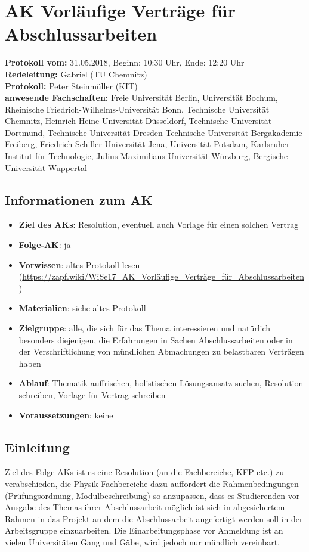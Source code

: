 
\section{AK Vorläufige Verträge für Abschlussarbeiten}

	\textbf{Protokoll vom:} 31.05.2018,
	Beginn: 10:30 Uhr,
	Ende: 12:20 Uhr \\
	\textbf{Redeleitung:} Gabriel (TU Chemnitz) \\
	\textbf{Protokoll:} Peter Steinmüller (KIT) \\
	\textbf{anwesende Fachschaften:} Freie Universität Berlin, Universität Bochum, Rheinische Friedrich-Wilhelms-Universität Bonn, Technische Universität Chemnitz, Heinrich Heine Universität Düsseldorf, Technische Universität Dortmund, Technische Universität Dresden Technische Universität Bergakademie Freiberg, Friedrich-Schiller-Universität Jena, Universität Potsdam, Karlsruher Institut für Technologie, Julius-Maximilians-Universität Würzburg, Bergische Universität Wuppertal

	\subsection*{Informationen zum AK}
		\begin{itemize}
			\item \textbf{Ziel des AKs}: Resolution, eventuell auch Vorlage für einen solchen Vertrag
			\item \textbf{Folge-AK}: ja
			\item \textbf{Vorwissen}: altes Protokoll lesen (\url{https://zapf.wiki/WiSe17_AK_Vorläufige_Verträge_für_Abschlussarbeiten})
      \item \textbf{Materialien}: siehe altes Protokoll
			\item \textbf{Zielgruppe}: alle, die sich für das Thema interessieren und natürlich besonders diejenigen, die Erfahrungen in Sachen Abschlussarbeiten oder in der Verschriftlichung von mündlichen Abmachungen zu belastbaren Verträgen haben
			\item \textbf{Ablauf}: Thematik auffrischen, holistischen Lösungsansatz suchen, Resolution schreiben, Vorlage für Vertrag schreiben
			\item \textbf{Voraussetzungen}: keine
		\end{itemize}

  \subsection{Einleitung}
  	Ziel des Folge-AKs ist es eine Resolution (an die Fachbereiche, KFP etc.) zu verabschieden, die Physik-Fachbereiche dazu auffordert die Rahmenbedingungen (Prüfungsordnung, Modulbeschreibung) so anzupassen, dass es Studierenden vor Ausgabe des Themas ihrer Abschlussarbeit möglich ist sich in abgesichertem Rahmen in das Projekt an dem die Abschlussarbeit angefertigt werden soll in der Arbeitsgruppe einzuarbeiten. Die Einarbeitungsphase vor Anmeldung ist an vielen Universitäten Gang und Gäbe, wird jedoch nur mündlich vereinbart.

